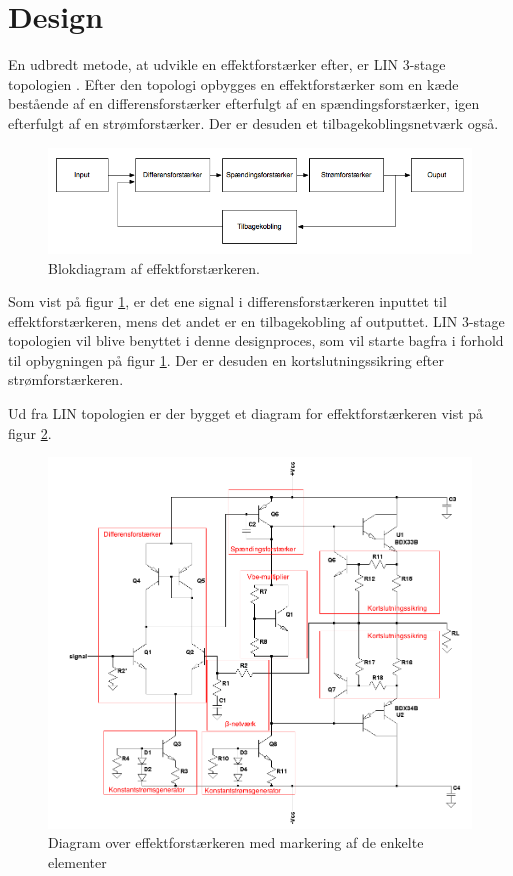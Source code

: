 \section{Design}
En udbredt metode, at udvikle en effektforstærker efter, er LIN 3-stage topologien \cite{ael-mm20}. Efter den topologi opbygges en effektforstærker som en kæde bestående af en differensforstærker efterfulgt af en spændingsforstærker, igen efterfulgt af en strømforstærker. Der er desuden et tilbagekoblingsnetværk også. 

\begin{figure}[h]
\centering
\includegraphics[scale=0.5]{teknisk/effektforstaerker/blokdiagram-effektforstaerker.png}
\caption{Blokdiagram af effektforstærkeren.}
\label{fig:lin_effektforstaerker}
\end{figure}

Som vist på figur \ref{fig:lin_effektforstaerker}, er det ene signal i differensforstærkeren inputtet til effektforstærkeren, mens det andet er en tilbagekobling af outputtet. LIN 3-stage topologien vil blive benyttet i denne designproces, som vil starte bagfra i forhold til opbygningen på figur \ref{fig:lin_effektforstaerker}. Der er desuden en kortslutningssikring efter strømforstærkeren.

Ud fra LIN topologien er der bygget et diagram for effektforstærkeren vist på figur \ref{fig:effektkredsloeb}.

\begin{figure}[h]
\centering
\includegraphics[width=\textwidth]{teknisk/effektforstaerker/effektforstaerker-clean.png}
\caption{Diagram over effektforstærkeren med markering af de enkelte elementer}
\label{fig:effektkredsloeb}
\end{figure}
